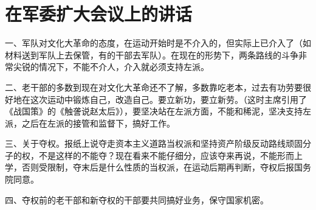 \section[在军委扩大会议上的讲话（一九六七年一月二十七日）]{在军委扩大会议上的讲话}


一、军队对文化大革命的态度，在运动开始时是不介入的，但实际上已介入了（如材料送到军队上去保管，有的干部去军队）。在现在的形势下，两条路线的斗争非常尖锐的情况下，不能不介人，介入就必须支持左派。

二、老干部的多数到现在对文化大革命还不了解，多数靠吃老本，过去有功劳要很好地在这次运动中锻炼自己，改造自己。要立新功，要立新劳。（这时主席引用了《战国策》的《触詟说赵太后》），要坚决站在左派方面，不能和稀泥，坚决支持左派，之后在左派的接管和监督下，搞好工作。

三、关于夺权。报纸上说夺走资本主义道路当权派和坚持资产阶级反动路线顽固分子的权，不是这样的不能夺？现在看来不能仔细分，应该夺来再说，不能形而上学，否则受限制，夺末后是什么性质的当权派，在运动后期再判断，夺权后报国务院同意。

四、夺权前的老干部和新夺权的干部要共同搞好业务，保守国家机密。


